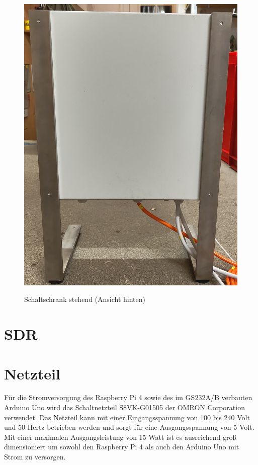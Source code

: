 \begin{figure}[H]
\begin{minipage}[b]{.4\linewidth}
		\includegraphics[width=\linewidth]{../ref/Schaltschrank_stehend_hinten.jpeg}
		\label{fig:schaltschrankstehendhinten}
		\caption{Schaltschrank stehend (Ansicht hinten)}
	\end{minipage}
\end{figure}

\section{SDR}
\label{sec:sdr}

\section{Netzteil}
\label{sec:Netzteil}
Für die Stromversorgung des Raspberry Pi 4 sowie des im GS232A/B verbauten Arduino Uno wird das Schaltnetzteil S8VK-G01505 der OMRON Corporation verwendet. Das Netzteil kann mit einer Eingangsspannung von 100 bis 240 Volt und 50 Hertz betrieben werden und sorgt für eine Ausgangsspannung von 5 Volt. Mit einer maximalen Ausgangsleistung von  15 Watt ist es ausreichend groß dimensioniert um sowohl den Raspberry Pi 4 \cite{noauthor_power_nodate} als auch den Arduino Uno \cite{noauthor_r3_nodate} mit Strom zu versorgen. \cite{noauthor_s8vk-g01505_nodate}

